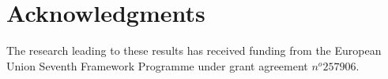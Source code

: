 \documentclass{sig-alternate}
\begin{document}

\section{Acknowledgments}
The research leading to these results has received funding from the European Union Seventh Framework Programme under grant agreement $n^o 257906$.
%

%
%
\end{document}
